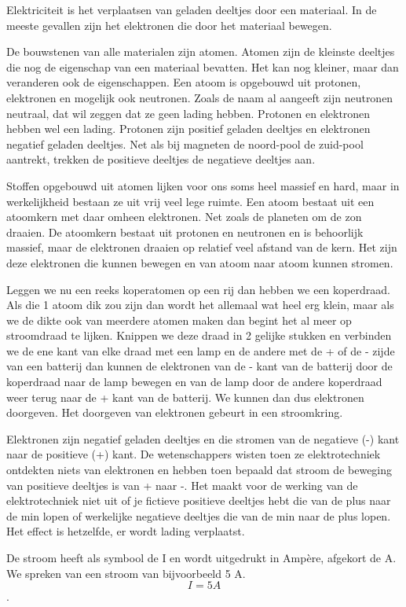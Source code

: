 Elektriciteit is het verplaatsen van geladen deeltjes door een materiaal. In de meeste gevallen zijn het elektronen die door het materiaal bewegen.

De bouwstenen van alle materialen zijn atomen. Atomen zijn de kleinste deeltjes die nog de eigenschap van een materiaal bevatten. Het kan nog kleiner, maar dan veranderen ook de eigenschappen. Een atoom is opgebouwd uit protonen, elektronen en mogelijk ook neutronen. Zoals de naam al aangeeft zijn neutronen neutraal, dat wil zeggen dat ze geen lading hebben. Protonen en elektronen hebben wel een lading. Protonen zijn positief geladen deeltjes en elektronen negatief geladen deeltjes. Net als bij magneten de noord-pool de zuid-pool aantrekt, trekken de positieve deeltjes de negatieve deeltjes aan.

Stoffen opgebouwd uit atomen lijken voor ons soms heel massief en hard, maar in werkelijkheid bestaan ze uit vrij veel lege ruimte. Een atoom bestaat uit een atoomkern met daar omheen elektronen. Net zoals de planeten om de zon draaien. De atoomkern bestaat uit protonen en neutronen en is behoorlijk massief, maar de elektronen draaien op relatief veel afstand van de kern. Het zijn deze elektronen die kunnen bewegen en van atoom naar atoom kunnen stromen.

Leggen we nu een reeks koperatomen op een rij dan hebben we een koperdraad. Als die 1 atoom dik zou zijn dan wordt het allemaal wat heel erg klein, maar als we de dikte ook van meerdere atomen maken dan begint het al meer op stroomdraad te lijken. Knippen we deze draad in 2 gelijke stukken en verbinden we de ene kant van elke draad met een lamp en de andere met de + of de - zijde van een batterij dan kunnen de elektronen van de - kant van de batterij door de koperdraad naar de lamp bewegen en van de lamp door de andere koperdraad weer terug naar de + kant van de batterij. We kunnen dan dus elektronen doorgeven. Het doorgeven van elektronen gebeurt in een stroomkring.

Elektronen zijn negatief geladen deeltjes en die stromen van de negatieve (-) kant naar de positieve (+) kant. De wetenschappers wisten toen ze elektrotechniek ontdekten niets van elektronen en hebben toen bepaald dat stroom de beweging van positieve deeltjes is van + naar -. Het maakt voor de werking van de elektrotechniek niet uit of je fictieve positieve deeltjes hebt die van de plus naar de min lopen of werkelijke negatieve deeltjes die van de min naar de plus lopen. Het effect is hetzelfde, er wordt lading verplaatst.

De stroom heeft als symbool de I en wordt uitgedrukt in Amp\`ere, afgekort de A. We spreken van een stroom van bijvoorbeeld 5 A. \[ I = 5 A \].

